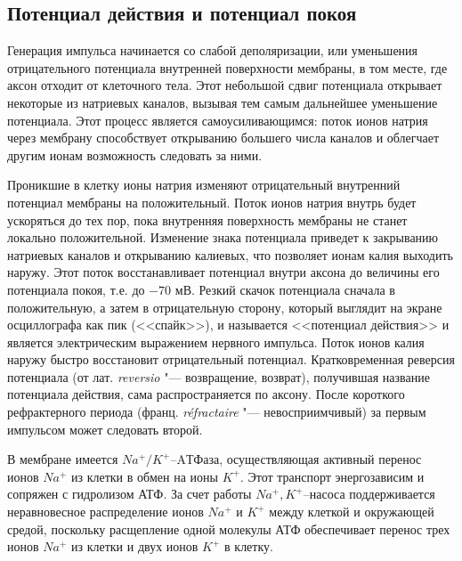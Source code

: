 \documentclass[12pt,a4paper,oneside]{book}
\begin{document}
\subsection{Потенциал действия и потенциал покоя}

Генерация импульса начинается со слабой деполяризации, или уменьшения отрицательного потенциала внутренней поверхности мембраны, в том месте, где аксон отходит от клеточного тела. Этот небольшой сдвиг потенциала открывает некоторые из натриевых каналов, вызывая тем самым дальнейшее уменьшение потенциала. Этот процесс является самоусиливающимся: поток ионов натрия через мембрану способствует открыванию большего числа каналов и облегчает другим ионам возможность следовать за ними. 

Проникшие в клетку ионы натрия изменяют отрицательный внутренний потенциал мембраны на положительный. Поток ионов натрия внутрь будет ускоряться до тех пор, пока внутренняя поверхность мембраны не станет локально положительной. Изменение знака потенциала приведет к закрыванию натриевых каналов и открыванию калиевых, что позволяет ионам калия выходить наружу. Этот поток восстанавливает потенциал внутри аксона до величины его потенциала покоя, т.е. до $-70$ мВ. Резкий скачок потенциала сначала в положительную, а затем в отрицательную сторону, который выглядит на экране осциллографа как пик (<<спайк>>), и называется <<потенциал действия>> и является электрическим выражением нервного импульса. Поток ионов калия наружу быстро восстановит отрицательный потенциал. Кратковременная реверсия потенциала (от лат. {\it reversio} "--- возвращение, возврат), получившая название потенциала действия, сама распространяется по аксону. После короткого рефрактерного периода (франц. {\it réfractaire} "--- невосприимчивый) за первым импульсом может следовать второй.

\par{}

В мембране имеется $Na^+/K^+$--AТФаза, осуществляющая активный перенос ионов $Na^+$ из клетки в обмен на ионы $K^+$. Этот транспорт энергозависим и сопряжен с гидролизом АТФ. За счет работы $Na^+,K^+$--насоса поддерживается неравновесное распределение ионов $Na^+$ и $K^+$ между клеткой и окружающей средой, поскольку расщепление одной молекулы АТФ обеспечивает перенос трех ионов $Na^+$ из клетки и двух ионов $K^+$ в клетку.
\end{document}
